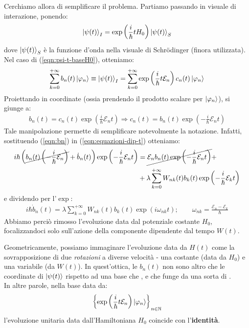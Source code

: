 \documentclass[../../InformazioneQuantistica.tex]{subfiles}
\begin{document}
Cerchiamo allora di semplificare il problema. Partiamo passando in visuale di interazione, ponendo:
\begin{align}
    \Ket{\psi(t)}_I = \exp\left(\frac{i}{\hbar} t H_0 \right) \Ket{\psi(t)}_S
    \label{eqn:visuale-interazione}
\end{align}
dove $\Ket{\psi(t)}_S$ è la funzione d'onda nella visuale di Schr\"odinger (finora utilizzata).\\
Nel caso di (\ref{eqn:psi-t-baseH0}), otteniamo:
\begin{align*}
    \sum_{k=0}^{+\infty} b_n(t) \Ket{\varphi_n} \equiv \Ket{\psi(t)}_I = \sum_{k=0}^{+\infty}\exp\left(\frac{i}{\hbar}t \mathcal{E}_n\right) c_n(t) \Ket{\varphi_n}
\end{align*}
Proiettando in coordinate (ossia prendendo il prodotto scalare per $\Ket{\varphi_n}$), si giunge a:
\begin{align}
    b_n(t) = c_n(t) \exp\left(\frac{i}{\hbar}\mathcal{E}_nt\right) \Rightarrow c_n(t) = b_n(t)\exp\left(-\frac{i}{\hbar}\mathcal{E}_nt\right)
    \label{eqn:bn}
\end{align}
Tale manipolazione permette di semplificare notevolmente la notazione. Infatti, sostituendo (\ref{eqn:bn}) in (\ref{eqn:equazioni-dip-t}) otteniamo:
\begin{align*}
    i\hbar \left( \cancel{b_n(t) \left(-\frac{i}{\hbar} \mathcal{E}_n \right)} + \dot{b}_n(t) \right) \exp\left(-\frac{i}{\hbar} \mathcal{E}_n t\right) &= \cancel{\mathcal{E}_n b_n(t) \exp\left(-\frac{i}{\hbar}\mathcal{E}_n t \right)} +\\
    &+ \lambda \sum_{k=0}^{+\infty} W_{nk}(t) b_k(t) \exp\left(-\frac{i}{\hbar} \mathcal{E}_k t \right)
\end{align*}
e dividendo per l'$\exp$:
\begin{align}
    i\hbar \dot{b}_n(t) = \lambda \sum_{k=0}^{+\infty} W_{nk}(t) b_k(t) \exp(i\omega_{nk}t); \qquad \omega_{nk} = \frac{\mathcal{E}_n - \mathcal{E}_k}{\hbar}
    \label{eqn:equazioni-bn-dip-t}
\end{align}
Abbiamo perciò rimosso l'evoluzione data dal potenziale costante $H_0$, focalizzandoci solo sull'azione della componente dipendente dal tempo $W(t)$.\\

\begin{expl}
Geometricamente, possiamo immaginare l'evoluzione data da $H(t)$ come la sovrapposizione di due \textit{rotazioni} a diverse velocità - una costante (data da $H_0$) e una variabile (da $W(t)$). In quest'ottica, le $b_n(t)$ non sono altro che le coordinate di $\Ket{\psi(t)}$ rispetto ad una base che , e che funge da una sorta di .\\
In altre parole, nella base data da:
\begin{align*}
    \left\{ \exp\left(\frac{i}{\hbar} t \mathcal{E}_n \right) \Ket{\varphi_n}\right\}_{n\in \mathbb{N}}
\end{align*}
l'evoluzione unitaria data dall'Hamiltoniana $H_0$ coincide con l'\textbf{identità}.
\end{expl}
\end{document}
